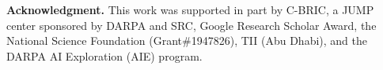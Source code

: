 \documentclass[runningheads]{llncs}
\begin{document}
\nocite{christensen20222022}

\noindent\textbf{Acknowledgment.}
This work was supported in part by C-BRIC, a JUMP center sponsored by DARPA and SRC, Google Research Scholar Award, the National Science Foundation (Grant\#1947826), TII (Abu Dhabi), and the DARPA AI Exploration (AIE) program. 



\end{document}
